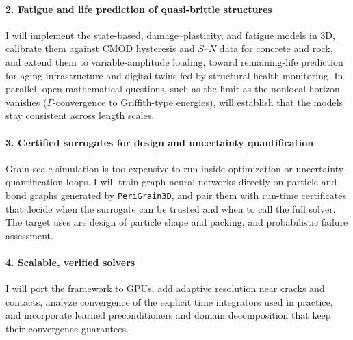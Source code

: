 \documentclass[11pt]{article}
\begin{document}
\paragraph{2. Fatigue and life prediction of quasi-brittle structures}
I will implement the state-based, damage--plasticity, and fatigue models in 3D,
calibrate them against CMOD hysteresis and $S$--$N$ data for concrete and rock,
and extend them to variable-amplitude loading, toward remaining-life prediction
for aging infrastructure and digital twins fed by structural health monitoring.
In parallel, open mathematical questions, such as the limit as the nonlocal
horizon vanishes ($\Gamma$-convergence to Griffith-type energies), will
establish that the models stay consistent across length scales.

\paragraph{3. Certified surrogates for design and uncertainty quantification}
Grain-scale simulation is too expensive to run inside optimization or
uncertainty-quantification loops. I will train graph neural networks directly
on particle and bond graphs generated by \texttt{PeriGrain3D}, and pair them
with run-time certificates that decide when the surrogate can be trusted and
when to call the full solver. The target uses are design of particle shape and
packing, and probabilistic failure assessment.

\paragraph{4. Scalable, verified solvers}
I will port the framework to GPUs, add adaptive resolution near cracks and
contacts, analyze convergence of the explicit time integrators used in
practice, and incorporate learned preconditioners and domain decomposition that
keep their convergence guarantees.
\end{document}
